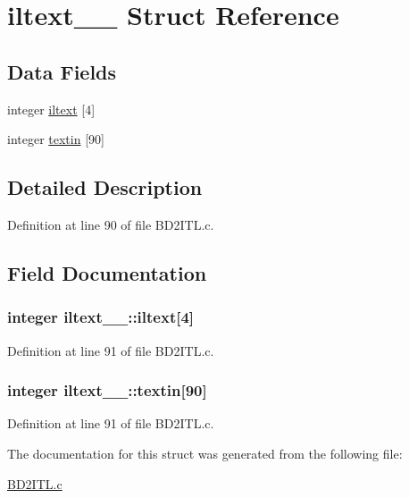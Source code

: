 \hypertarget{structiltext__1__}{}\section{iltext\+\_\+\_\+ Struct Reference}
\label{structiltext__1__}
\subsection*{Data Fields}
\begin{DoxyCompactItemize}
\item 
integer \hyperlink{structiltext__1___a7916a69140ead97252e7c01607d20172}{iltext} \mbox{[}4\mbox{]}
\item 
integer \hyperlink{structiltext__1___afc51e9a435c022ba0a35708a81e0741e}{textin} \mbox{[}90\mbox{]}
\end{DoxyCompactItemize}


\subsection{Detailed Description}


Definition at line 90 of file B\+D2\+I\+T\+L.\+c.



\subsection{Field Documentation}
\subsubsection[{\texorpdfstring{iltext}{iltext}}]{\setlength{\rightskip}{0pt plus 5cm}integer iltext\+\_\+\_\+\+::iltext\mbox{[}4\mbox{]}}\hypertarget{structiltext__1___a7916a69140ead97252e7c01607d20172}{}\label{structiltext__1___a7916a69140ead97252e7c01607d20172}


Definition at line 91 of file B\+D2\+I\+T\+L.\+c.

\subsubsection[{\texorpdfstring{textin}{textin}}]{\setlength{\rightskip}{0pt plus 5cm}integer iltext\+\_\+\_\+\+::textin\mbox{[}90\mbox{]}}\hypertarget{structiltext__1___afc51e9a435c022ba0a35708a81e0741e}{}\label{structiltext__1___afc51e9a435c022ba0a35708a81e0741e}


Definition at line 91 of file B\+D2\+I\+T\+L.\+c.



The documentation for this struct was generated from the following file\+:\begin{DoxyCompactItemize}
\item 
\hyperlink{BD2ITL_8c}{B\+D2\+I\+T\+L.\+c}\end{DoxyCompactItemize}
